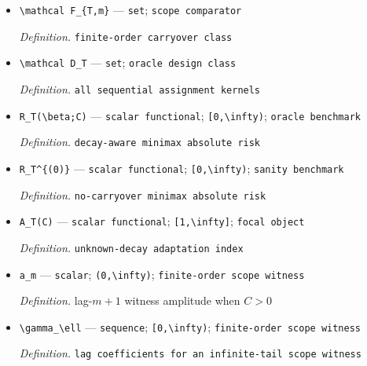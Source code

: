 \documentclass{article}
\begin{document}
\begin{itemize}
  \par\smallskip\noindent\emph{Definition.} \texttt{no-\allowbreak{}carryover class with unrestricted direct effects}
  \item \texttt{\textbackslash{}\allowbreak{}mathcal F\_\allowbreak{}\{T,\allowbreak{}m\}\allowbreak{}} --- \texttt{set}; \texttt{scope comparator}
  \par\smallskip\noindent\emph{Definition.} \texttt{finite-\allowbreak{}order carryover class}
  \item \texttt{\textbackslash{}\allowbreak{}mathcal D\_\allowbreak{}T} --- \texttt{set}; \texttt{oracle design class}
  \par\smallskip\noindent\emph{Definition.} \texttt{all sequential assignment kernels}
  \item \texttt{R\_\allowbreak{}T(\textbackslash{}\allowbreak{}beta;\allowbreak{}C)} --- \texttt{scalar functional}; \texttt{[0,\allowbreak{}\textbackslash{}\allowbreak{}infty)}; \texttt{oracle benchmark}
  \par\smallskip\noindent\emph{Definition.} \texttt{decay-\allowbreak{}aware minimax absolute risk}
  \item \texttt{R\_\allowbreak{}T\textasciicircum{}\{(0)\}\allowbreak{}} --- \texttt{scalar functional}; \texttt{[0,\allowbreak{}\textbackslash{}\allowbreak{}infty)}; \texttt{sanity benchmark}
  \par\smallskip\noindent\emph{Definition.} \texttt{no-\allowbreak{}carryover minimax absolute risk}
  \item \texttt{A\_\allowbreak{}T(C)} --- \texttt{scalar functional}; \texttt{[1,\allowbreak{}\textbackslash{}\allowbreak{}infty]}; \texttt{focal object}
  \par\smallskip\noindent\emph{Definition.} \texttt{unknown-\allowbreak{}decay adaptation index}
  \item \texttt{a\_\allowbreak{}m} --- \texttt{scalar}; \texttt{(0,\allowbreak{}\textbackslash{}\allowbreak{}infty)}; \texttt{finite-\allowbreak{}order scope witness}
  \par\smallskip\noindent\emph{Definition.} lag-\(m+1\) witness amplitude when \(C>0\)
  \item \texttt{\textbackslash{}\allowbreak{}gamma\_\allowbreak{}\textbackslash{}\allowbreak{}ell} --- \texttt{sequence}; \texttt{[0,\allowbreak{}\textbackslash{}\allowbreak{}infty)}; \texttt{finite-\allowbreak{}order scope witness}
  \par\smallskip\noindent\emph{Definition.} \texttt{lag coefficients for an infinite-\allowbreak{}tail scope witness}

\end{itemize}
\end{document}
